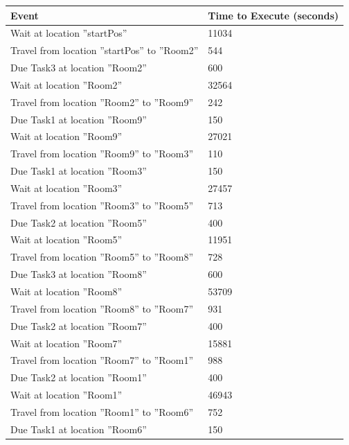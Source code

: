 \documentclass{article}
\begin{document}
\begin{center}
    \begin{tabular}{ | p{5cm} | p{5cm} |}
    \hline
    Event & Time to Execute (seconds) \\ \hline \hline
    Wait at location ''startPos'' & 11034 \\ \hline
    Travel from location ''startPos'' to ''Room2'' & 544 \\ \hline
    Due Task3 at location ''Room2'' & 600 \\ \hline
    
    Wait at location ''Room2'' & 32564 \\ \hline
    Travel from location ''Room2'' to ''Room9'' & 242 \\ \hline
    Due Task1 at location ''Room9'' & 150 \\ \hline
    
    Wait at location ''Room9'' & 27021 \\ \hline
    Travel from location ''Room9'' to ''Room3'' & 110 \\ \hline
    Due Task1 at location ''Room3'' & 150 \\ \hline
    
    Wait at location ''Room3'' & 27457 \\ \hline
    Travel from location ''Room3'' to ''Room5'' & 713 \\ \hline
    Due Task2 at location ''Room5'' & 400 \\ \hline
    
    Wait at location ''Room5'' & 11951 \\ \hline
    Travel from location ''Room5'' to ''Room8'' & 728 \\ \hline
    Due Task3 at location ''Room8'' & 600 \\ \hline
    
    Wait at location ''Room8'' & 53709 \\ \hline
    Travel from location ''Room8'' to ''Room7'' & 931 \\ \hline
    Due Task2 at location ''Room7'' & 400 \\ \hline
    
    Wait at location ''Room7'' & 15881 \\ \hline
    Travel from location ''Room7'' to ''Room1'' & 988 \\ \hline
    Due Task2 at location ''Room1'' & 400 \\ \hline
    
    Wait at location ''Room1'' & 46943 \\ \hline
    Travel from location ''Room1'' to ''Room6'' & 752 \\ \hline
    Due Task1 at location ''Room6'' & 150 \\ \hline
    

\end{tabular}
\end{center}
\end{document}
